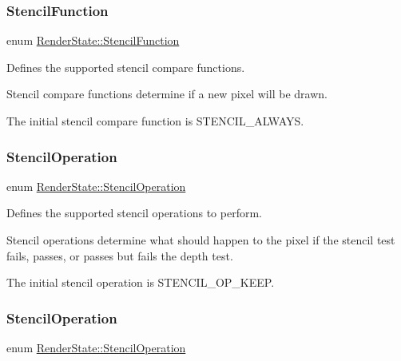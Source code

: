\subsubsection{\texorpdfstring{Stencil\+Function}{StencilFunction}\hspace{0.1cm}{\footnotesize\ttfamily [2/2]}}
{\footnotesize\ttfamily enum \hyperlink{classRenderState_a81cc5aa349c93afd42db28eea9de0165}{Render\+State\+::\+Stencil\+Function}}

Defines the supported stencil compare functions.

Stencil compare functions determine if a new pixel will be drawn.

The initial stencil compare function is S\+T\+E\+N\+C\+I\+L\+\_\+\+A\+L\+W\+A\+YS. \mbox{\label{classRenderState_a47a31ccd6ff5801cb0618df7e25f7f70}} 
\subsubsection{\texorpdfstring{Stencil\+Operation}{StencilOperation}\hspace{0.1cm}{\footnotesize\ttfamily [1/2]}}
{\footnotesize\ttfamily enum \hyperlink{classRenderState_a47a31ccd6ff5801cb0618df7e25f7f70}{Render\+State\+::\+Stencil\+Operation}}

Defines the supported stencil operations to perform.

Stencil operations determine what should happen to the pixel if the stencil test fails, passes, or passes but fails the depth test.

The initial stencil operation is S\+T\+E\+N\+C\+I\+L\+\_\+\+O\+P\+\_\+\+K\+E\+EP. \mbox{\label{classRenderState_a47a31ccd6ff5801cb0618df7e25f7f70}} 
\subsubsection{\texorpdfstring{Stencil\+Operation}{StencilOperation}\hspace{0.1cm}{\footnotesize\ttfamily [2/2]}}
{\footnotesize\ttfamily enum \hyperlink{classRenderState_a47a31ccd6ff5801cb0618df7e25f7f70}{Render\+State\+::\+Stencil\+Operation}}

